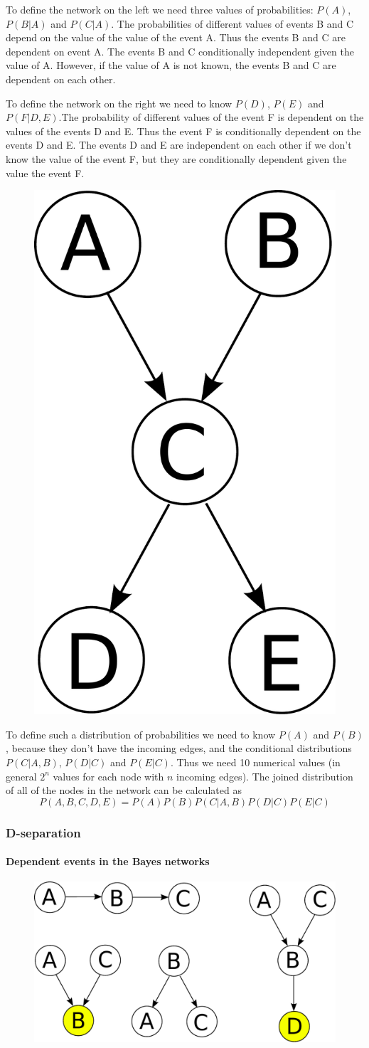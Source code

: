 \documentclass[a4paper,10pt]{article}
\begin{document}
To define the network on the left we need three values of probabilities: $P(A)$, $P(B|A)$ and $P(C|A)$. The probabilities of different values of events B and C depend on the value of the value of the event A. Thus the events B and C are dependent on event A. The events B and C conditionally independent given the value of A. However, if the value of A is not known, the events B and C are dependent on each other.

To define the network on the right we need to know $P(D)$, $P(E)$ and $P(F|D,E)$.The probability of different values of the event F is dependent on the values of the events D and E. Thus the event F is conditionally dependent on the events D and E. The events D and E are independent on each other if we don't know the value of the event F, but they are conditionally dependent given the value the event F.

\begin{figure}[h!]
\centering
\includegraphics[height=0.3\textwidth]{Bayes3.pdf}
\end{figure}
To define such a distribution of probabilities we need to know $P(A)$ and $P(B)$, because they don't have the incoming edges, and the conditional distributions $P(C|A,B)$, $P(D|C)$ and $P(E|C)$. Thus we need 10 numerical values (in general $2^n$ values for each node with $n$ incoming edges). The joined distribution of all of the nodes in the network can be calculated as
\[ P(A,B,C,D,E) = P(A)P(B)P(C|A,B)P(D|C)P(E|C)\]

\subsubsection{D-separation}
\paragraph*{Dependent events in the Bayes networks}

\begin{figure}[h!]
\centering
\includegraphics[height=0.3\textwidth]{ActiveTriplet.pdf}
\end{figure}
\end{document}
